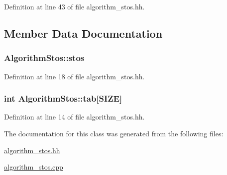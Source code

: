 Definition at line 43 of file algorithm\-\_\-stos.\-hh.



\subsection{Member Data Documentation}
\hypertarget{class_algorithm_stos_a0b803ecc25fd3586cf07969697367754}{
\subsubsection[{stos}]{ Algorithm\-Stos\-::stos\hspace{0.3cm}{\ttfamily [private]}}}\label{class_algorithm_stos_a0b803ecc25fd3586cf07969697367754}


Definition at line 18 of file algorithm\-\_\-stos.\-hh.

\hypertarget{class_algorithm_stos_a2fb5db929aa54bf64794c812830d8648}{
\subsubsection[{tab}]{\setlength{\rightskip}{0pt plus 5cm}int Algorithm\-Stos\-::tab\mbox{[}{\bf S\-I\-Z\-E}\mbox{]}\hspace{0.3cm}{\ttfamily [private]}}}\label{class_algorithm_stos_a2fb5db929aa54bf64794c812830d8648}


Definition at line 14 of file algorithm\-\_\-stos.\-hh.



The documentation for this class was generated from the following files\-:\begin{DoxyCompactItemize}
\item 
\hyperlink{algorithm__stos_8hh}{algorithm\-\_\-stos.\-hh}\item 
\hyperlink{algorithm__stos_8cpp}{algorithm\-\_\-stos.\-cpp}\end{DoxyCompactItemize}
